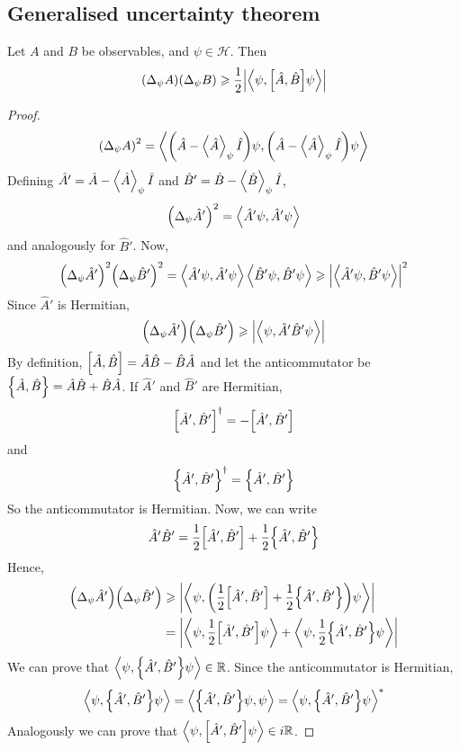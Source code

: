 \documentclass[a4paper]{article}
\begin{document}
\subsection{Generalised uncertainty theorem}
\begin{theorem}
	Let \( A \) and \( B \) be observables, and \( \psi \in \mathcal H \).
	Then
	\[
		\qty(\Delta_\psi A)\qty(\Delta_\psi B) \geqslant \frac{1}{2} \abs{\left\langle{\psi, \qty[\hat A, \hat B]\psi}\right\rangle}
	\]
\end{theorem}
\begin{proof}
	\[
		\qty(\Delta_\psi A)^2 = \left\langle{\qty(\hat A - \left\langle{\hat A}\right\rangle_\psi \hat I) \psi, \qty(\hat A - \left\langle{\hat A}\right\rangle_\psi \hat I) \psi}\right\rangle
	\]
	Defining \( \hat A' = \hat A - \left\langle{\hat A}\right\rangle_\psi \hat I \) and \( \hat B' = \hat B - \left\langle{\hat B}\right\rangle_\psi \hat I \),
	\[
		\qty(\Delta_\psi \hat A')^2 = \left\langle{\hat A' \psi, \hat A' \psi}\right\rangle
	\]
	and analogously for \( \hat B' \).
	Now,
	\[
		\qty(\Delta_\psi \hat A')^2 \qty(\Delta_\psi \hat B')^2 = \left\langle{\hat A' \psi, \hat A' \psi}\right\rangle \left\langle{\hat B' \psi, \hat B' \psi}\right\rangle \geqslant \abs{\left\langle{\hat A' \psi, \hat B' \psi}\right\rangle}^2
	\]
	Since \( \hat A' \) is Hermitian,
	\[
		\qty(\Delta_\psi \hat A') \qty(\Delta_\psi \hat B') \geqslant \abs{\left\langle{\psi, \hat A' \hat B' \psi}\right\rangle}
	\]
	By definition, \( \qty[\hat A, \hat B] = \hat A \hat B - \hat B \hat A \) and let the anticommutator be \( \qty{\hat A, \hat B} = \hat A \hat B + \hat B \hat A \).
	If \( \hat A' \) and \( \hat B' \) are Hermitian,
	\[
		\qty[\hat A', \hat B']^\dagger = - \qty[\hat A', \hat B']
	\]
	and
	\[
		\qty{\hat A', \hat B'}^\dagger = \qty{\hat A', \hat B'}
	\]
	So the anticommutator is Hermitian.
	Now, we can write
	\[
		\hat A' \hat B' = \frac{1}{2} \qty[\hat A', \hat B'] + \frac{1}{2} \qty{\hat A', \hat B'}
	\]
	Hence,
	\begin{align*}
		\qty(\Delta_\psi \hat A') \qty(\Delta_\psi \hat B') & \geqslant \abs{\left\langle{\psi, \qty(\frac{1}{2} \qty[\hat A', \hat B'] + \frac{1}{2} \qty{\hat A', \hat B'}) \psi}\right\rangle}           \\
		                                                    & = \abs{\left\langle{\psi, \frac{1}{2} \qty[\hat A', \hat B'] \psi}\right\rangle + \left\langle{\psi, \frac{1}{2} \qty{\hat A', \hat B'} \psi}\right\rangle}
	\end{align*}
	We can prove that \( \left\langle{\psi, \qty{\hat A', \hat B'} \psi}\right\rangle \in \mathbb R \).
	Since the anticommutator is Hermitian,
	\[
		\left\langle{\psi, \qty{\hat A', \hat B'} \psi}\right\rangle = \left\langle{\qty{\hat A', \hat B'} \psi, \psi}\right\rangle = \left\langle{\psi, \qty{\hat A', \hat B'} \psi}\right\rangle^*
	\]
	Analogously we can prove that \( \left\langle{\psi, \qty[\hat A', \hat B'] \psi}\right\rangle \in i\mathbb R \).

\end{proof}
\end{document}
